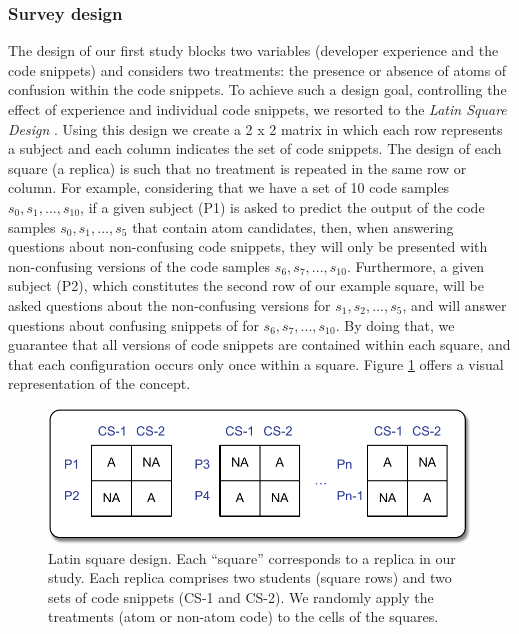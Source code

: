 \subsubsection{Survey design} 

The design of our first study blocks two variables
(developer experience and the code snippets) and
considers two treatments: the presence or absence of 
atoms of confusion within the code snippets. 
To achieve such a design goal, controlling the effect of experience and individual code snippets, we resorted to the \textit{Latin Square Design} \cite{Hunter-Experimenters}. Using this design we create a 2 x 2 matrix in which each row represents a subject and each column indicates the set of code snippets. The design of each square (a replica) is such that no treatment is repeated in the same row or column. For example, considering that we have a set of 10
code samples $s_0, s_1, ..., s_{10}$, if a given subject (P1) is asked to predict the output of the code samples $s_0, s_1, ..., s_5$ that contain atom candidates, then, when answering questions about non-confusing code snippets, they will only be presented with non-confusing versions of the code samples $s_6, s_7,..., s_{10}$. Furthermore, a given subject (P2), which constitutes the second row of our example square, will be asked questions about the non-confusing versions for $s_1, s_2, ..., s_5$, and will answer questions about confusing snippets of for $s_6, s_7,..., s_{10}$. By doing that, we guarantee that all versions of code snippets are contained within each square, and that each configuration occurs only once within a square. Figure \ref{fig:latinsquare} offers a visual representation of the concept.

  \begin{figure}[htb!]
      \noindent
      \centering
      \includegraphics[scale=.50]{images/latin-square.pdf}
      \caption{Latin square design. Each ``square'' corresponds to 
      a replica in our study. Each replica comprises two students (square rows) 
      and two sets of code snippets (CS-1 and CS-2). We randomly apply the 
      treatments (atom or non-atom code) to the cells of the squares.} 
      \label{fig:latinsquare}
  \end{figure}


